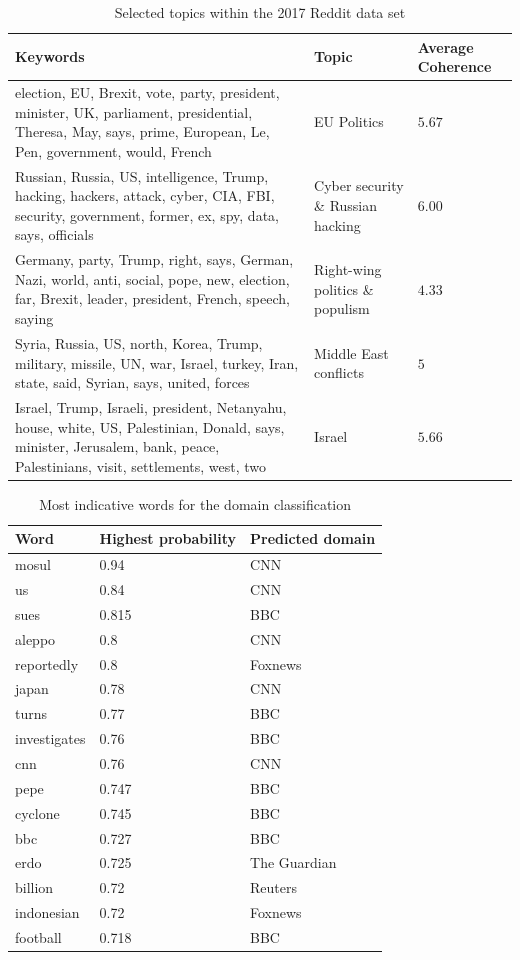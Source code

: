 \documentclass[final]{ieee}
\begin{document}
\begin{table}[htb]
\caption{Selected topics within the 2017 Reddit data set}
\begin{tabularx}{\textwidth}{X|l|l}
Keywords & Topic & Average Coherence \\ \hline
election, EU, Brexit, vote, party, president, minister, UK, parliament, presidential, Theresa, May, says, prime, European, Le, Pen, government, would, French & EU Politics & $5.67$ \\ \hline
Russian, Russia, US, intelligence, Trump, hacking, hackers, attack, cyber, CIA, FBI, security, government, former, ex, spy, data, says, officials & Cyber security \& Russian hacking & $6.00$ \\ \hline
Germany, party, Trump, right, says, German, Nazi, world, anti, social, pope, new, election, far, Brexit, leader, president, French, speech, saying & Right-wing politics \& populism & $4.33$ \\ \hline
Syria, Russia, US, north, Korea, Trump, military, missile, UN, war, Israel, turkey, Iran, state, said, Syrian, says, united, forces & Middle East conflicts & $5$ \\ \hline
Israel, Trump, Israeli, president, Netanyahu, house, white, US, Palestinian, Donald, says, minister, Jerusalem, bank, peace, Palestinians, visit, settlements, west, two & Israel & $5.66$ \\
\end{tabularx}
\label{tab:topics}
\end{table}

\begin{table}[htb]
\caption{Most indicative words for the domain classification}
\begin{tabularx}{\textwidth}{X|l|l}
Word & Highest probability & Predicted domain \\ \hline
mosul & 0.94 & CNN \\ \hline
us & 0.84 & CNN \\ \hline
sues & 0.815 & BBC \\ \hline
aleppo & 0.8 & CNN \\ \hline
reportedly & 0.8 & Foxnews \\ \hline
japan & 0.78 & CNN \\ \hline
turns & 0.77 & BBC \\ \hline
investigates & 0.76 & BBC \\ \hline
cnn & 0.76 & CNN \\ \hline
pepe & 0.747 & BBC \\ \hline
cyclone & 0.745 & BBC \\ \hline
bbc & 0.727 & BBC \\ \hline
erdo & 0.725 & The Guardian \\ \hline
billion & 0.72 & Reuters \\ \hline
indonesian & 0.72 & Foxnews \\ \hline
football & 0.718 & BBC \\
\end{tabularx}
\label{tab:indicativeWords}
\end{table}
\end{document}
